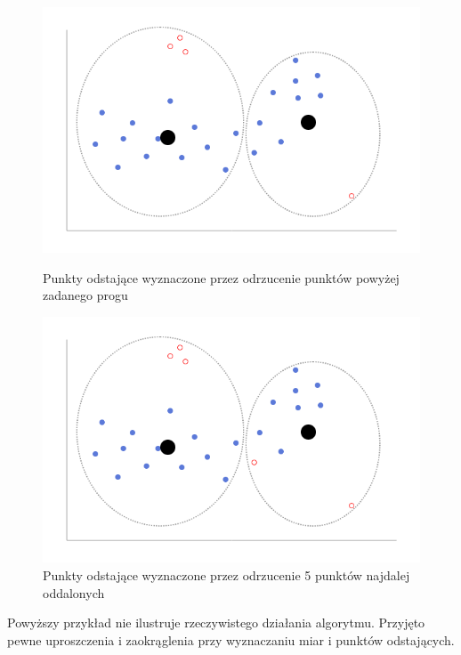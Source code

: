 \documentclass[eng,printmode]{mgr}
\begin{document}
\begin{figure}[H]
  \begin{center}
    \includegraphics[scale=0.5]{kmean_dist_2}
    \caption{Punkty odstające wyznaczone przez odrzucenie punktów powyżej zadanego progu}
\end{center}

\begin{center}
  \includegraphics[scale=0.5]{kmean_dist_3}
  \caption{Punkty odstające wyznaczone przez odrzucenie 5 punktów najdalej oddalonych}
  \end{center}
\end{figure}
Powyższy przykład nie ilustruje rzeczywistego działania algorytmu. Przyjęto pewne uproszczenia i zaokrąglenia przy wyznaczaniu miar i punktów odstających.
\end{document}
